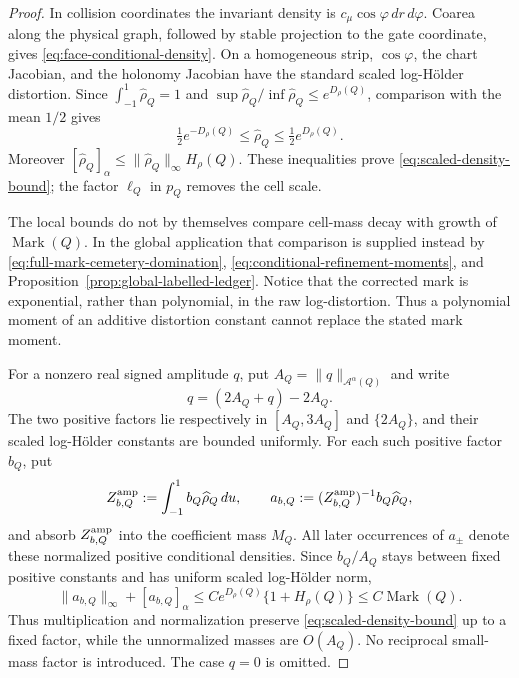 \documentclass[11pt]{article}
\begin{document}
\begin{proof}
In collision coordinates the invariant density is
\(c_\mu\cos\varphi\,dr\,d\varphi\).  Coarea along the physical graph, followed
by stable projection to the gate coordinate, gives
\eqref{eq:face-conditional-density}.  On a homogeneous strip,
\(\cos\varphi\), the chart Jacobian, and the holonomy Jacobian have the
standard scaled log-Hölder distortion.  Since
$\int_{-1}^1\widehat\rho_Q=1$ and
$\sup\widehat\rho_Q/\inf\widehat\rho_Q\le e^{D_\rho(Q)}$, comparison with
the mean $1/2$ gives
\[
 \tfrac12e^{-D_\rho(Q)}\le\widehat\rho_Q
 \le\tfrac12e^{D_\rho(Q)}.
\]
Moreover
$[\widehat\rho_Q]_{\alpha}\le
\|\widehat\rho_Q\|_\infty H_\rho(Q)$.  These inequalities prove
\eqref{eq:scaled-density-bound}; the factor $\ell_Q$ in $p_Q$ removes the
cell scale.

The local bounds do not by themselves compare cell-mass decay with growth
of $\operatorname{Mark}(Q)$.  In the global application that comparison is
supplied instead by \eqref{eq:full-mark-cemetery-domination},
\eqref{eq:conditional-refinement-moments}, and
Proposition~\ref{prop:global-labelled-ledger}.  Notice that the corrected
mark is exponential, rather than polynomial, in the raw log-distortion.
Thus a polynomial moment of an additive distortion constant cannot replace
the stated mark moment.

For a nonzero real signed amplitude $q$, put
$A_Q=\|q\|_{\mathcal A^\alpha(Q)}$ and write
\[
 q=(2A_Q+q)-2A_Q.
\]
The two positive factors lie respectively in $[A_Q,3A_Q]$ and
$\{2A_Q\}$, and their scaled log-Hölder constants are bounded uniformly.
For each such positive factor $b_Q$, put
\begin{equation}
\label{eq:positive-amplitude-density-normalization}
 Z_{b,Q}^{\rm amp}:=\int_{-1}^1b_Q\widehat\rho_Q\,du,\qquad
 a_{b,Q}:=(Z_{b,Q}^{\rm amp})^{-1}b_Q\widehat\rho_Q,
\end{equation}
and absorb $Z_{b,Q}^{\rm amp}$ into the coefficient mass $M_Q$.  All later
occurrences of $a_\pm$ denote these normalized positive conditional
densities.  Since $b_Q/A_Q$ stays between fixed positive constants and has
uniform scaled log-Hölder norm,
\begin{equation}
\label{eq:normalized-positive-amplitude-density-bound}
 \|a_{b,Q}\|_\infty+[a_{b,Q}]_\alpha
 \le Ce^{D_\rho(Q)}\{1+H_\rho(Q)\}
 \le C\operatorname{Mark}(Q).
\end{equation}
Thus multiplication and normalization preserve
\eqref{eq:scaled-density-bound} up to a fixed factor, while the
unnormalized masses are $O(A_Q)$.  No reciprocal small-mass factor is
introduced.  The case $q=0$ is omitted.
\end{proof}
\end{document}
